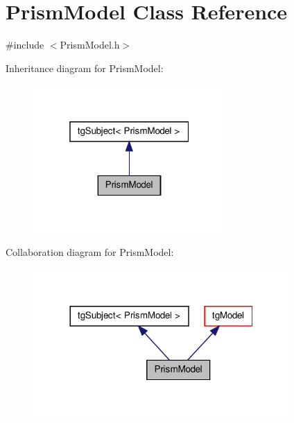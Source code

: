\hypertarget{class_prism_model}{\section{Prism\-Model Class Reference}
\label{class_prism_model}
}


{\ttfamily \#include $<$Prism\-Model.\-h$>$}



Inheritance diagram for Prism\-Model\-:\nopagebreak
\begin{figure}[H]
\begin{center}
\leavevmode
\includegraphics[width=208pt]{class_prism_model__inherit__graph}
\end{center}
\end{figure}


Collaboration diagram for Prism\-Model\-:\nopagebreak
\begin{figure}[H]
\begin{center}
\leavevmode
\includegraphics[width=276pt]{class_prism_model__coll__graph}
\end{center}
\end{figure}

